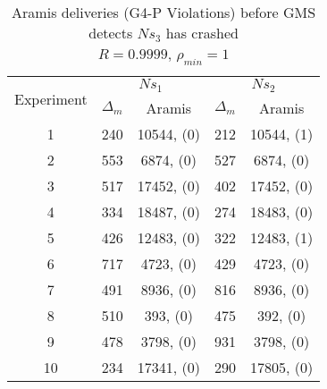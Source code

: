 \begin{table}[p]
    \begin{center}
        \renewcommand{\arraystretch}{1.25}
        \begin{tabular}{|c|c|c|c|c|}
            \hline
            \multirow{2}{*}{Experiment} & \multicolumn{2}{|c|}{$Ns_1$} & \multicolumn{2}{|c|}{$Ns_2$} \\ \cline{2-5}
                                                       & $\Delta_m$&\textsf{Aramis} & $\Delta_m$&\textsf{Aramis} \\ \hline \hline
            1 & 240 & 10544, (0) & 212 & 10544, (1) \\ \hline
            2 & 553 & 6874, (0) & 527 & 6874, (0) \\ \hline
            3 & 517 & 17452, (0) & 402 & 17452, (0) \\ \hline
            4 & 334 & 18487, (0) & 274 & 18483, (0) \\ \hline
            5 & 426 & 12483, (0) & 322 & 12483, (1) \\ \hline
            6 & 717 & 4723, (0) & 429 & 4723, (0) \\ \hline
            7 & 491 & 8936, (0) & 816 & 8936, (0) \\ \hline
            8 & 510 & 393, (0) & 475 & 392, (0) \\ \hline
            9 & 478 & 3798, (0) & 931 & 3798, (0) \\ \hline
            10 & 234 & 17341, (0) & 290 & 17805, (0) \\  \hline
        \end{tabular}
        \caption[\textsf{Aramis} deliveries before GMS detects node crash ($R=0.9999$, $\rho_{min}=1$)]{\textsf{Aramis} deliveries (G4-P Violations) before GMS detects $Ns_3$ has crashed \\ $R=0.9999$, $\rho_{min}=1$}
        \label{table:crashed_node_rho1}
    \end{center}
\end{table}

